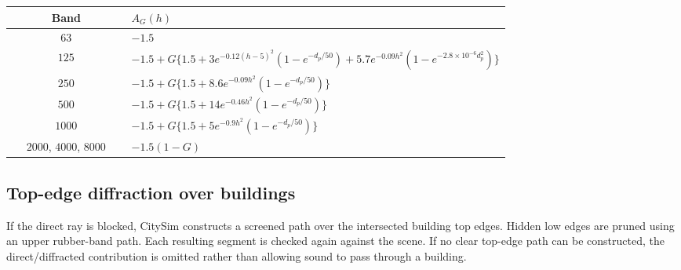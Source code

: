 \documentclass[11pt,a4paper]{article}
\newcommand{\toprule}{\hline}
\newcommand{\midrule}{\hline}
\newcommand{\bottomrule}{\hline}
\begin{document}
\begin{center}
\scriptsize
\begin{tabular}{c p{0.76\linewidth}}
\toprule
Band & $A_G(h)$ \\
\midrule
$63$ &
$-1.5$ \\
$125$ &
$-1.5 + G\{1.5+3e^{-0.12(h-5)^2}(1-e^{-d_p/50})
+5.7e^{-0.09h^2}(1-e^{-2.8\times10^{-6}d_p^2})\}$ \\
$250$ &
$-1.5 + G\{1.5+8.6e^{-0.09h^2}(1-e^{-d_p/50})\}$ \\
$500$ &
$-1.5 + G\{1.5+14e^{-0.46h^2}(1-e^{-d_p/50})\}$ \\
$1000$ &
$-1.5 + G\{1.5+5e^{-0.9h^2}(1-e^{-d_p/50})\}$ \\
$2000$, $4000$, $8000$ &
$-1.5(1-G)$ \\
\bottomrule
\end{tabular}
\end{center}

\subsection{Top-edge diffraction over buildings}

If the direct ray is blocked, CitySim constructs a screened path over the
intersected building top edges. Hidden low edges are pruned using an upper
rubber-band path. Each resulting segment is checked again against the scene.
If no clear top-edge path can be constructed, the direct/diffracted
contribution is omitted rather than allowing sound to pass through a building.
\end{document}
